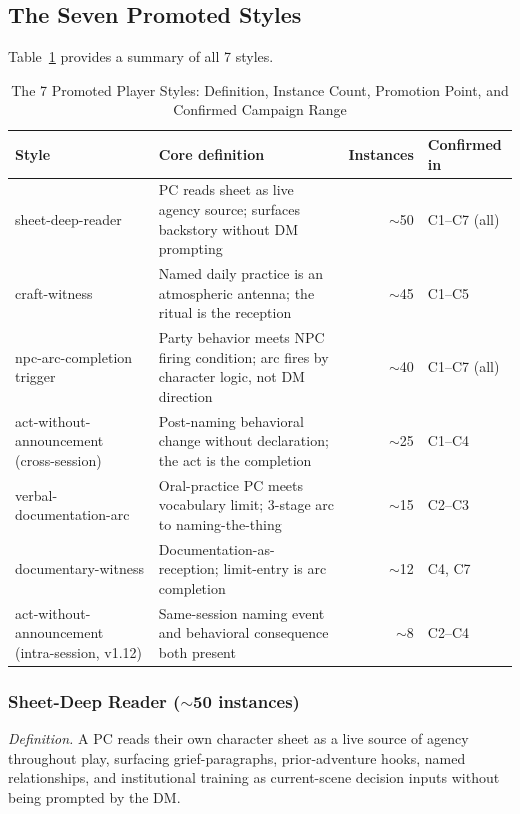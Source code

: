 \subsection{The Seven Promoted Styles}

Table~\ref{tab:styles-overview} provides a summary of all 7 styles.

\begin{table}[t]
\centering
\caption{The 7 Promoted Player Styles: Definition, Instance Count, Promotion Point,
         and Confirmed Campaign Range}
\label{tab:styles-overview}
\begin{tabular}{@{}lp{5cm}rp{2.5cm}@{}}
\toprule
Style & Core definition & Instances & Confirmed in \\
\midrule
sheet-deep-reader
  & PC reads sheet as live agency source; surfaces backstory without DM prompting
  & $\sim$50 & C1--C7 (all) \\
craft-witness
  & Named daily practice is an atmospheric antenna; the ritual is the reception
  & $\sim$45 & C1--C5 \\
npc-arc-completion trigger
  & Party behavior meets NPC firing condition; arc fires by character logic, not
    DM direction
  & $\sim$40 & C1--C7 (all) \\
act-without-announcement (cross-session)
  & Post-naming behavioral change without declaration; the act is the completion
  & $\sim$25 & C1--C4 \\
verbal-documentation-arc
  & Oral-practice PC meets vocabulary limit; 3-stage arc to naming-the-thing
  & $\sim$15 & C2--C3 \\
documentary-witness
  & Documentation-as-reception; limit-entry is arc completion
  & $\sim$12 & C4, C7 \\
act-without-announcement (intra-session, v1.12)
  & Same-session naming event and behavioral consequence both present
  & $\sim$8 & C2--C4 \\
\bottomrule
\end{tabular}
\end{table}

\subsubsection{Sheet-Deep Reader ($\sim$50 instances)}

\textit{Definition.} A PC reads their own character sheet as a live source of agency
throughout play, surfacing grief-paragraphs, prior-adventure hooks, named relationships,
and institutional training as current-scene decision inputs without being prompted by
the DM.

